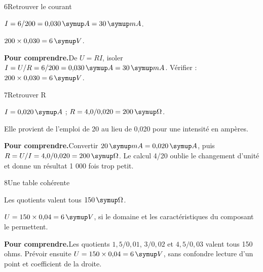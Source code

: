 \par\noindent\begin{minipage}{\linewidth}
\begin{corrige}{6}{Retrouver le courant}
\begin{questions}
\item $I=6/200=0{,}030\unite A=30\unite{mA}$.
\item $200\times0{,}030=6\unite V$.
\end{questions}
\par\smallskip\noindent\textbf{Pour comprendre.}\enspace De $U=RI$, isoler $I=U/R=6/200=0{,}030\unite A=30\unite{mA}$. Vérifier : $200\times0{,}030=6\unite V$.\par
\end{corrige}
\end{minipage}
\par\noindent\begin{minipage}{\linewidth}
\begin{corrige}{7}{Retrouver R}
\begin{questions}
\item $I=0{,}020\unite A$ ; $R=4{,}0/0{,}020=200\unite\Omega$.
\item Elle provient de l’emploi de 20 au lieu de 0,020 pour une intensité en ampères.
\end{questions}
\par\smallskip\noindent\textbf{Pour comprendre.}\enspace Convertir $20\unite{mA}=0{,}020\unite A$, puis $R=U/I=4{,}0/0{,}020=200\unite\Omega$. Le calcul 4/20 oublie le changement d’unité et donne un résultat 1 000 fois trop petit.\par
\end{corrige}
\end{minipage}
\par\noindent\begin{minipage}{\linewidth}
\begin{corrige}{8}{Une table cohérente}
\begin{questions}
\item Les quotients valent tous $150\unite\Omega$.
\item $U=150\times0{,}04=6\unite V$, si le domaine et les caractéristiques du composant le permettent.
\end{questions}
\par\smallskip\noindent\textbf{Pour comprendre.}\enspace Les quotients $1{,}5/0{,}01$, $3/0{,}02$ et $4{,}5/0{,}03$ valent tous 150 ohms. Prévoir ensuite $U=150\times0{,}04=6\unite V$, sans confondre lecture d’un point et coefficient de la droite.\par
{}
\end{corrige}
\end{minipage}
